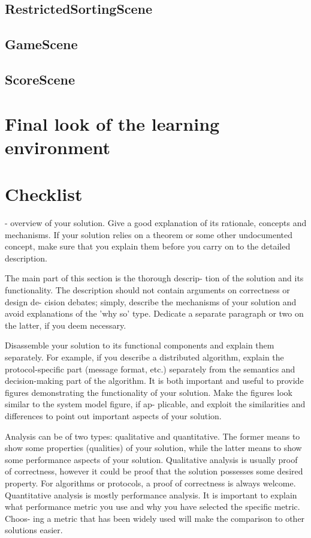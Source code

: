 \subsection{RestrictedSortingScene}
\subsection{GameScene}
\subsection{ScoreScene}


\section{Final look of the learning environment}


\section{Checklist}

- overview of your solution. Give a good explanation of its rationale,
concepts and mechanisms. If your solution relies on a
theorem or some other undocumented concept, make sure
that you explain them before you carry on to the detailed
description.

The main part of this section is the thorough descrip-
tion of the solution and its functionality.
The description should not contain arguments on correctness or design de-
cision debates; simply, describe the mechanisms of your
solution and avoid explanations of the 'why so' type.
Dedicate a separate paragraph or two on the latter, if
you deem necessary.

Disassemble your solution to its functional components
and explain them separately. For example, if you describe
a distributed algorithm, explain the protocol-specific part
(message format, etc.) separately from the semantics and
decision-making part of the algorithm.
It is both important and useful to provide figures
demonstrating the functionality of your solution. Make
the figures look similar to the system model figure, if ap-
plicable, and exploit the similarities and differences to
point out important aspects of your solution.

Analysis can be of two types: qualitative and quantitative.
The former means to show some properties (qualities)
of your solution, while the latter means to show some
performance aspects of your solution.
Qualitative analysis is usually proof of correctness,
however it could be proof that the solution possesses some
desired property. For algorithms or protocols, a proof of
correctness is always welcome.
Quantitative analysis is mostly performance analysis.
It is important to explain what performance metric you
use and why you have selected the specific metric. Choos-
ing a metric that has been widely used will make the
comparison to other solutions easier.
